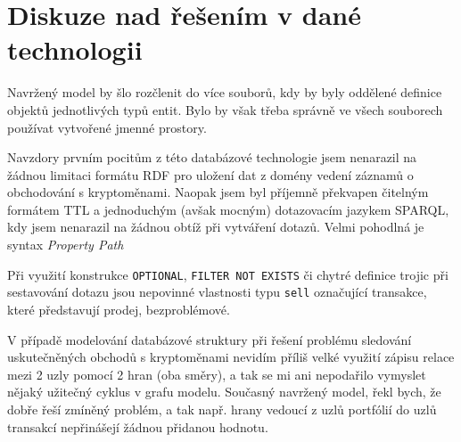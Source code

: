 \documentclass[12pt, a4paper]{article}
\let\oldsection\section
\renewcommand\section{\clearpage\oldsection}
\begin{document}
\section{Diskuze nad řešením v dané technologii}
Navržený model by šlo rozčlenit do více souborů, kdy by byly oddělené definice objektů jednotlivých typů entit. Bylo by však třeba správně ve všech souborech používat vytvořené jmenné prostory.

Navzdory prvním pocitům z této databázové technologie jsem nenarazil na žádnou limitaci formátu RDF pro uložení dat z domény vedení záznamů o obchodování s kryptoměnami. Naopak jsem byl příjemně překvapen čitelným formátem TTL a jednoduchým (avšak mocným) dotazovacím jazykem SPARQL, kdy jsem nenarazil na žádnou obtíž při vytváření dotazů. Velmi pohodlná je syntax \textit{Property Path}

Při využití konstrukce \texttt{OPTIONAL}, \texttt{FILTER NOT EXISTS} či chytré definice trojic při sestavování dotazu jsou nepovinné vlastnosti typu \texttt{sell} označující transakce, které představují prodej, bezproblémové.

V případě modelování databázové struktury při řešení problému sledování uskutečněných obchodů s kryptoměnami nevidím příliš velké využití zápisu relace mezi 2 uzly pomocí 2 hran (oba směry), a tak se mi ani nepodařilo vymyslet nějaký užitečný cyklus v grafu modelu. Současný navržený model, řekl bych, že dobře řeší zmíněný problém, a tak např. hrany vedoucí z uzlů portfólií do uzlů transakcí nepřinášejí žádnou přidanou hodnotu. 
\end{document}
